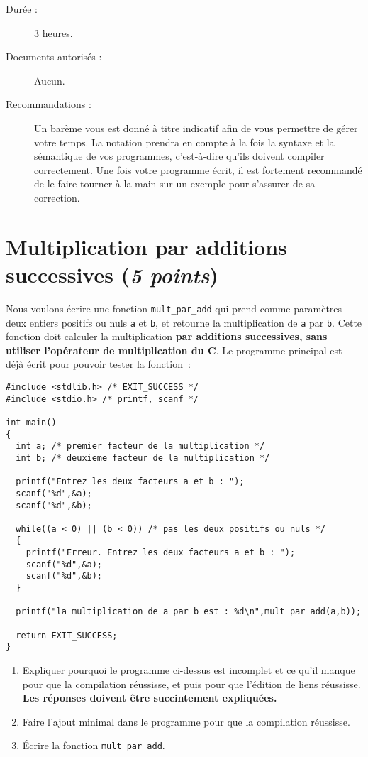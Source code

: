 
\newcommand{\commentaire}[1]{}


\begin{description}
\item[Durée :] 3 heures.
\item[Documents autorisés :] Aucun.
\item[Recommandations :] Un barème vous est donné à
titre indicatif afin de vous permettre de gérer votre temps. La
notation prendra en compte à la fois la syntaxe et la sémantique de
vos programmes, c'est-à-dire qu'ils doivent compiler correctement. Une
fois votre programme écrit, il est fortement recommandé de le faire tourner à la
main sur un exemple pour s'assurer de sa correction.
\end{description}

\section{Multiplication par additions successives (\textit{5 points})}

Nous voulons écrire une fonction \verb|mult_par_add| qui prend comme
paramètres deux entiers positifs ou nuls \verb|a| et \verb|b|, et
retourne la multiplication de \verb|a| par \verb|b|. Cette fonction
doit calculer la multiplication \textbf{par additions
  successives, sans utiliser l'opérateur de multiplication du C}. Le
programme principal est déjà écrit pour pouvoir tester la fonction~:
\begin{verbatim}
#include <stdlib.h> /* EXIT_SUCCESS */
#include <stdio.h> /* printf, scanf */

int main()
{
  int a; /* premier facteur de la multiplication */
  int b; /* deuxieme facteur de la multiplication */

  printf("Entrez les deux facteurs a et b : ");
  scanf("%d",&a);
  scanf("%d",&b);

  while((a < 0) || (b < 0)) /* pas les deux positifs ou nuls */
  {
    printf("Erreur. Entrez les deux facteurs a et b : ");
    scanf("%d",&a);
    scanf("%d",&b);
  }

  printf("la multiplication de a par b est : %d\n",mult_par_add(a,b));

  return EXIT_SUCCESS;
}
\end{verbatim}

\begin{enumerate}
\item Expliquer pourquoi le programme ci-dessus est incomplet et ce qu'il manque pour que la compilation réussisse, et puis pour que l'édition de liens réussisse. \textbf{Les réponses doivent être succintement expliquées.}
\item Faire l'ajout minimal dans le programme pour que la compilation réussisse.
\item Écrire la fonction \verb|mult_par_add|.
\end{enumerate}

